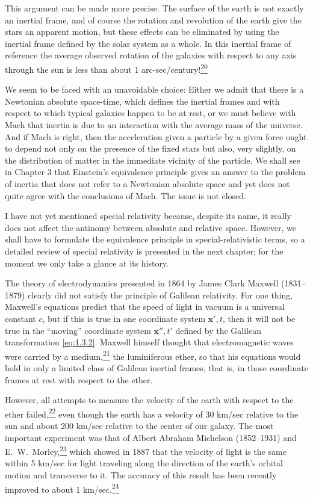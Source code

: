 This argument can be made more precise. The surface of the earth is not
exactly an inertial frame, and of course the rotation and revolution of the
earth give the stars an apparent motion, but these effects can be eliminated
by using the inertial frame defined by the solar system as a whole. In this
inertial frame of reference the average observed rotation of the galaxies with
respect to any axis through the sun is less than about 1
arc-sec/century!\hyperref[ch1-ref-20]{\textsuperscript{20}}

We seem to be faced with an unavoidable choice: Either we admit that there is
a Newtonian absolute space-time, which defines the inertial frames and with
respect to which typical galaxies happen to be at rest, or we must believe
with Mach that inertia is due to an interaction with the average mass of the
universe. And if Mach is right, then the acceleration given a particle by a
given force ought to depend not only on the presence of the fixed stars but
also, very slightly, on the distribution of matter in the immediate vicinity
of the particle. We shall see in Chapter 3 that Einstein's equivalence
principle gives an answer to the problem of inertia that does not refer to a
Newtonian absolute space and yet does not quite agree with the conclusions of
Mach. The issue is not closed.

I have not yet mentioned special relativity because, despite its name, it
really does not affect the antinomy between absolute and relative space.
However, we shall have to formulate the equivalence principle in
special-relativistic terms, so a detailed review of special relativity is
presented in the next chapter; for the moment we only take a glance at its
history.

The theory of electrodynamics presented in 1864 by James Clark Maxwell
(1831--1879) clearly did not satisfy the principle of Galilean relativity. For
one thing, Maxwell's equations predict that the speed of light in vacuum is a
universal constant \(c\), but if this is true in one coordinate system
\(\mathbf x',t\), then it will not be true in the ``moving'' coordinate system
\(\mathbf x'',t'\) defined by the Galilean transformation \eqref{eq:1.3.2}.
Maxwell himself thought that electromagnetic waves were carried by a
medium,\hyperref[ch1-ref-21]{\textsuperscript{21}} the luminiferous ether, so
that his equations would hold in only a limited class of Galilean inertial
frames, that is, in those coordinate frames at rest with respect to the ether.

However, all attempts to measure the velocity of the earth with respect to the
ether failed,\hyperref[ch1-ref-22]{\textsuperscript{22}} even though the earth
has a velocity of 30 km/sec relative to the sun and about 200 km/sec relative
to the center of our galaxy. The most important experiment was that of Albert
Abraham Michelson (1852--1931) and E.\ W.\
Morley,\hyperref[ch1-ref-23]{\textsuperscript{23}} which showed in 1887 that
the velocity of light is the same within 5 km/sec for light traveling along
the direction of the earth's orbital motion and transverse to it. The accuracy
of this result has been recently improved to about 1
km/sec.\hyperref[ch1-ref-24]{\textsuperscript{24}}

